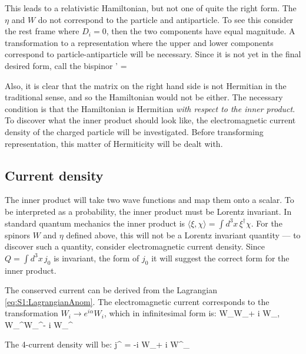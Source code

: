 This leads to a relativistic Hamiltonian, but not one of quite the right form.  The $\eta$ and $W$ do not correspond to the particle and antiparticle.  To see this consider the rest frame where $D_i =0$, then the two components have equal magnitude.  A transformation to a representation where the upper and lower components correspond to particle-antiparticle will be necessary.  Since it is not yet in the final desired form, call the bispinor
 \beq
 	\Upsilon' = 
 \eeq

Also, it is clear that the matrix on the right hand side is not Hermitian in the traditional sense, and so the Hamiltonian would not be either.  The necessary condition is that the Hamiltonian is Hermitian {\it with respect to the inner product}.  To discover what the inner product should look like, the electromagnetic current density of the charged particle will be investigated.  Before transforming representation, this matter of Hermiticity will be dealt with.


\subsection{Current density }

The inner product will take two wave functions and map them onto a scalar.  To be interpreted as a probability, the inner product must be Lorentz invariant.  In standard quantum mechanics the inner product is $\langle \xi, \chi \rangle = \int d^3x \, \xi^\dagger \chi$.  For the spinors $W$ and $\eta$ defined above, this will not be a Lorentz invariant quantity --- to discover such a quantity, consider electromagnetic current density.  Since $Q =  \int d^3x \, j_0$ is invariant, the form of $j_0$ it will suggest the correct form for the inner product.

The conserved current can be derived from the Lagrangian \eqref{eq:S1:LagrangianAnom}.  The electromagnetic current corresponds to the transformation $ W_i \to e^{i \alpha}W_i $, which in infinitesimal form is:
\beq
	W_\mu \to W_\mu + i \alpha W_\mu, \;
	W_\mu^\dagger \to W_\mu^\dagger - i \alpha W_\mu^{\dagger}
\eeq

The 4-current density will be:
\beq
	j^{\sigma} = -i  W_\mu  +  i W^\dagger_\mu
\eeq

